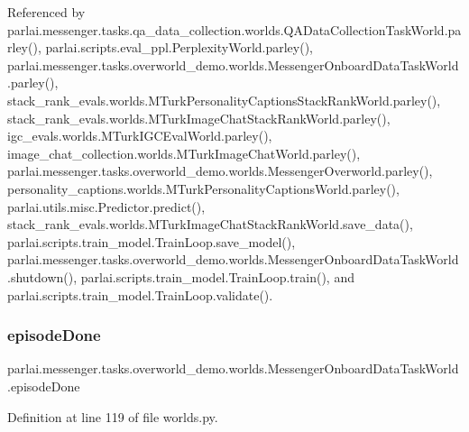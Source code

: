 Referenced by parlai.\+messenger.\+tasks.\+qa\+\_\+data\+\_\+collection.\+worlds.\+Q\+A\+Data\+Collection\+Task\+World.\+parley(), parlai.\+scripts.\+eval\+\_\+ppl.\+Perplexity\+World.\+parley(), parlai.\+messenger.\+tasks.\+overworld\+\_\+demo.\+worlds.\+Messenger\+Onboard\+Data\+Task\+World.\+parley(), stack\+\_\+rank\+\_\+evals.\+worlds.\+M\+Turk\+Personality\+Captions\+Stack\+Rank\+World.\+parley(), stack\+\_\+rank\+\_\+evals.\+worlds.\+M\+Turk\+Image\+Chat\+Stack\+Rank\+World.\+parley(), igc\+\_\+evals.\+worlds.\+M\+Turk\+I\+G\+C\+Eval\+World.\+parley(), image\+\_\+chat\+\_\+collection.\+worlds.\+M\+Turk\+Image\+Chat\+World.\+parley(), parlai.\+messenger.\+tasks.\+overworld\+\_\+demo.\+worlds.\+Messenger\+Overworld.\+parley(), personality\+\_\+captions.\+worlds.\+M\+Turk\+Personality\+Captions\+World.\+parley(), parlai.\+utils.\+misc.\+Predictor.\+predict(), stack\+\_\+rank\+\_\+evals.\+worlds.\+M\+Turk\+Image\+Chat\+Stack\+Rank\+World.\+save\+\_\+data(), parlai.\+scripts.\+train\+\_\+model.\+Train\+Loop.\+save\+\_\+model(), parlai.\+messenger.\+tasks.\+overworld\+\_\+demo.\+worlds.\+Messenger\+Onboard\+Data\+Task\+World.\+shutdown(), parlai.\+scripts.\+train\+\_\+model.\+Train\+Loop.\+train(), and parlai.\+scripts.\+train\+\_\+model.\+Train\+Loop.\+validate().

\mbox{\label{classparlai_1_1messenger_1_1tasks_1_1overworld__demo_1_1worlds_1_1MessengerOnboardDataTaskWorld_a4e2d9c247e2910c7a4c3e26a4e4761d7}} 
\subsubsection{\texorpdfstring{episode\+Done}{episodeDone}}
{\footnotesize\ttfamily parlai.\+messenger.\+tasks.\+overworld\+\_\+demo.\+worlds.\+Messenger\+Onboard\+Data\+Task\+World.\+episode\+Done}



Definition at line 119 of file worlds.\+py.



